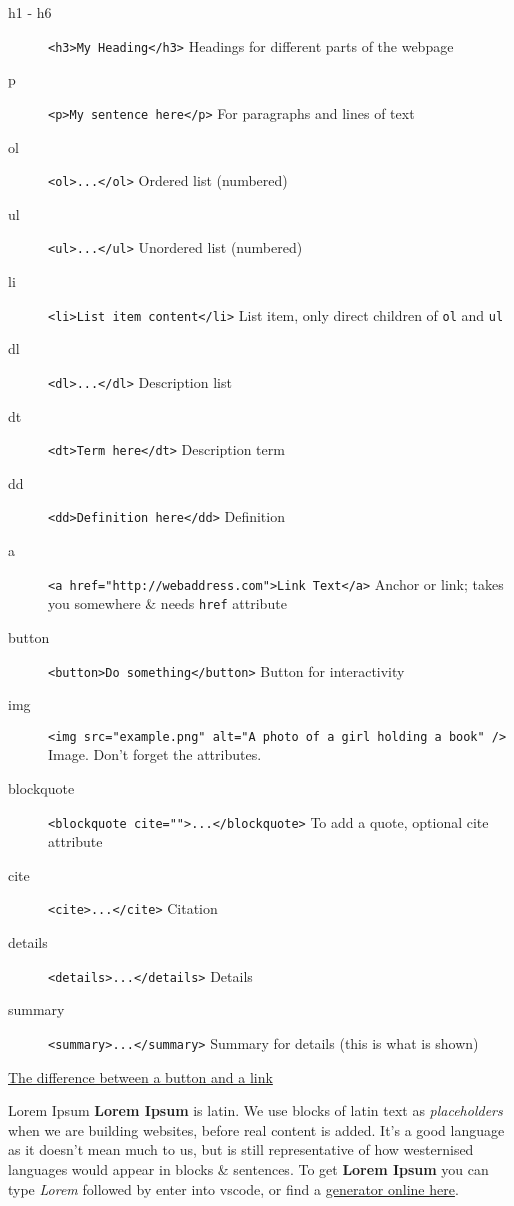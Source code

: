 \begin{description}
	\item[h1 - h6] \texttt{<h3>My Heading</h3>} Headings for different parts of the webpage
	\item[p] \texttt{<p>My sentence here</p>} For paragraphs and lines of text
	\item[ol] \texttt{<ol>...</ol>} Ordered list (numbered)
	\item[ul] \texttt{<ul>...</ul>} Unordered list (numbered)
	\item[li] \texttt{<li>List item content</li>} List item, only direct children of \texttt{ol} and \texttt{ul}
	\item[dl] \texttt{<dl>...</dl>} Description list
	\item[dt] \texttt{<dt>Term here</dt>} Description term
	\item[dd] \texttt{<dd>Definition here</dd>} Definition
	\item[a] \texttt{<a href="http://webaddress.com">Link Text</a>} Anchor or link; takes you somewhere \& needs \texttt{href} attribute
	\item[button] \texttt{<button>Do something</button>} Button for interactivity
	\item[img] \texttt{<img src="example.png" alt="A photo of a girl holding a book" />} Image. Don't forget the attributes.
	\item[blockquote] \texttt{<blockquote cite="">...</blockquote>} To add a quote, optional cite attribute
	\item[cite] \texttt{<cite>...</cite>} Citation
	\item[details] \texttt{<details>...</details>} Details
	\item[summary] \texttt{<summary>...</summary>} Summary for details (this is what is shown)
\end{description}

\href{https://css-tricks.com/a-complete-guide-to-links-and-buttons/}{The difference between a button and a link}

\begin{infobox}{Lorem Ipsum}
    \textbf{Lorem Ipsum} is latin. We use blocks of latin text as \textit{placeholders} when we are building websites, before real content is added. It's a good language as it doesn't mean much to us, but is still representative of how westernised languages would appear in blocks \& sentences.
    To get \textbf{Lorem Ipsum} you can type \textit{Lorem} followed by enter into vscode, or find a \href{https://www.lipsum.com/}{generator online here}.
\end{infobox}

